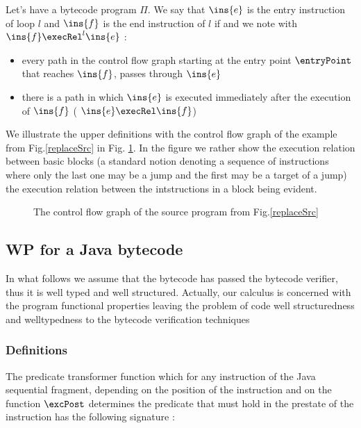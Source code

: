 \begin{defn}
\label{defLoop}
Let's have a bytecode program $\Pi$. We say that $\ins{e}$ is the entry instruction of loop $l$  and $\ins{f}$ is the end instruction
 of $l$ if and we note with
$ \ins{f} \execRel^l \ins{e}$ :
\begin{itemize}
\item every path in the control flow graph starting at the entry point $\entryPoint$  that reaches $\ins{f}$, passes through  $\ins{e}$ 
\item there is a path in which $\ins{e}$  is executed immediately after the execution of $\ins{f}$ ( $\ins{e} \execRel \ins{f}$)
\end{itemize}
\end{defn}


We illustrate the upper definitions with the control flow graph of the example from Fig.\ref{replaceSrc} in Fig. \ref{ctrlflow}.
In the figure we rather show the execution relation between basic blocks (a standard notion denoting a sequence of instructions where only the last one may be a 
jump and the first may be a target of a jump) the execution relation between the intstructions in a block being evident.


\begin{figure}[ht!]
\begin{center}
\caption{The control flow graph of the source program from Fig.\ref{replaceSrc} }
\label{ctrlflow}
\end{center}
\end{figure}



\subsection{WP for a Java bytecode }\label{wp}
In what follows we assume that the bytecode has passed the bytecode verifier, thus it is well typed and well structured. Actually, our calculus is concerned 
with the program functional properties leaving the problem of code well structuredness and welltypedness to the bytecode verification techniques 


\subsubsection{Definitions} \label{wpHelp}
The predicate transformer function which for any instruction of the Java sequential fragment, depending
on the position of the instruction and on the function $\excPost$ determines the predicate that must hold in the prestate of the
instruction has the following signature :

